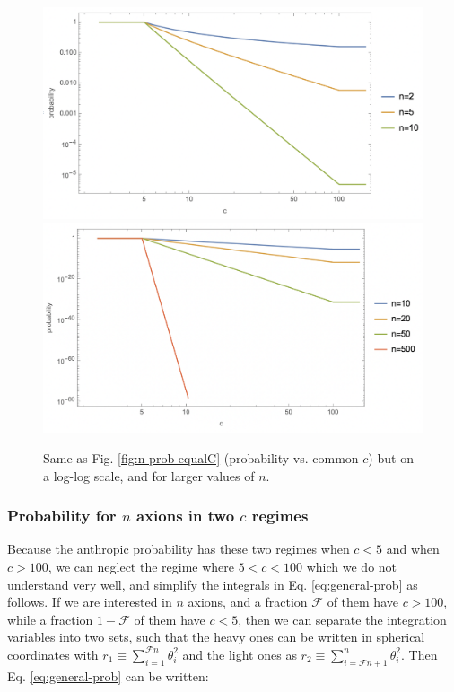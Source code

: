 \documentclass{article}
\begin{document}
\begin{figure}[h]
    \includegraphics[scale=0.45]{figs/naxions-equalC-loglog1.png}
    \includegraphics[scale=0.45]{figs/naxions-equalC-loglog2.png}
    \centering
    \caption{Same as Fig. \ref{fig:n-prob-equalC} (probability vs. common $c$) but on a log-log scale, and for larger values of $n$.}
    \label{fig:n-prob-equalC-loglog}
\end{figure}

\subsubsection{Probability for $n$ axions in two $c$ regimes}

Because the anthropic probability has these two regimes when $c<5$ and when $c>100$, we can neglect the regime where $5<c<100$ which we do not understand very well, and simplify the integrals in Eq. \eqref{eq:general-prob} as follows. If we are interested in $n$ axions, and a fraction $\mathcal{F}$ of them have $c>100$, while a fraction $1-\mathcal{F}$ of them have $c<5$, then we can separate the integration variables into two sets, such that the heavy ones can be written in spherical coordinates with $r_1 \equiv \sum_{i=1}^{\mathcal{F}n} \theta_i^2$ and the light ones as $r_2 \equiv \sum_{i=\mathcal{F}n+1}^{n} \theta_i^2$. Then Eq. \eqref{eq:general-prob} can be written:
\end{document}
